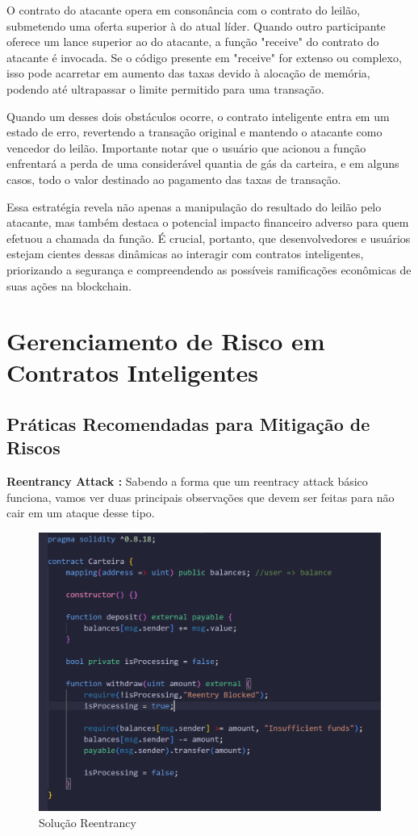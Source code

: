 O contrato do atacante opera em consonância com o contrato do leilão, submetendo uma oferta superior à do atual líder. Quando outro participante oferece um lance superior ao do atacante, a função "receive" do contrato do atacante é invocada. Se o código presente em "receive"  for extenso ou complexo, isso pode acarretar em aumento das taxas devido à alocação de memória, podendo até ultrapassar o limite permitido para uma transação.

Quando um desses dois obstáculos ocorre, o contrato inteligente entra em um estado de erro, revertendo a transação original e mantendo o atacante como vencedor do leilão. Importante notar que o usuário que acionou a função enfrentará a perda de uma considerável quantia de gás da carteira, e em alguns casos, todo o valor destinado ao pagamento das taxas de transação.

Essa estratégia revela não apenas a manipulação do resultado do leilão pelo atacante, mas também destaca o potencial impacto financeiro adverso para quem efetuou a chamada da função. É crucial, portanto, que desenvolvedores e usuários estejam cientes dessas dinâmicas ao interagir com contratos inteligentes, priorizando a segurança e compreendendo as possíveis ramificações econômicas de suas ações na blockchain.

\section{Gerenciamento de Risco em Contratos Inteligentes}



\subsection{Práticas Recomendadas para Mitigação de Riscos}

\textbf{Reentrancy Attack \cite{RA}: }Sabendo a forma que um reentracy attack básico funciona, vamos ver duas principais observações que devem ser feitas para não cair em um ataque desse tipo.
\begin{figure}
    \centering
    \includegraphics[width=0.5\linewidth]{figuras/RASolution.png}
    \caption{Solução Reentrancy}
    \label{fig:enter-label}
\end{figure}

